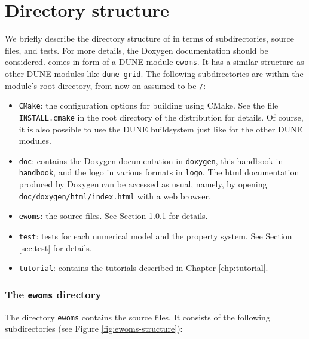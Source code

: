\chapter{Directory structure}

We briefly describe the directory structure of \eWoms in terms
of subdirectories, source files, and tests. For more details,
the Doxygen documentation should be considered.
\eWoms comes in form of a DUNE module \texttt{ewoms}.
It has a similar structure as other DUNE modules like \texttt{dune-grid}.
The following subdirectories are within the module's root directory,
from now on assumed to be \texttt{/}:
\begin{itemize}
\item \texttt{CMake}: the configuration options
for building \eWoms using CMake. See the file \texttt{INSTALL.cmake} in
the root directory of the \eWoms distribution for details. Of course,
it is also possible to use the DUNE buildsystem just like for the other
DUNE modules.
\item \texttt{doc}: contains the Doxygen documentation in \texttt{doxygen},
this handbook in \texttt{handbook}, and the \eWoms logo in various formats in
\texttt{logo}. The html documentation produced by Doxygen can be accessed as usual,
namely, by opening \texttt{doc/doxygen/html/index.html} with a web browser.
\item \texttt{ewoms}: the \eWoms source files. See Section \ref{sec:ewoms} for details.
\item \texttt{test}: tests for each numerical model and the property system.
See Section \ref{sec:test} for details.
\item \texttt{tutorial}: contains the tutorials described in Chapter \ref{chp:tutorial}.
\end{itemize}


\subsection{The \texttt{ewoms} directory}\label{sec:ewoms}

The directory \texttt{ewoms} contains the \eWoms source files. It consists of the following subdirectories (see Figure \ref{fig:ewoms-structure}):

